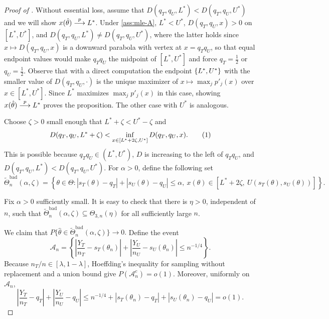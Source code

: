 \documentclass[12pt,reqno]{amsart}
\theoremstyle{theorem}
\theoremstyle{definition}
\newcommand\numberthis{\addtocounter{equation}{1}\tag{\theequation}}
\newcommand{\0}{\mathbf{0}}
\newcommand{\1}{\mathbf{1}}
\begin{document}
\begin{proof}[Proof of ]
Without essential loss, assume that
$
D(q_T,q_U,L^*)<D(q_T,q_U,U^*)
$ and we will show $x(\hat\theta) \overset{p}{\longrightarrow} L^*$.
Under \eqref{ass:mle-A}, \(L^*<U^*\), \(D(q_T,q_U,x)>0\) on
\([L^*,U^*]\), and
$
D(q_T,q_U,L^*) \neq D(q_T,q_U,U^*)$, where the latter holds since \(x \mapsto D(q_T,q_U,x)\) is a downward parabola with vertex at \(x = q_Tq_U\), so that equal endpoint values would make \(q_Tq_U\) the midpoint of \([L^*,U^*]\) and force \(q_T = \tfrac{1}{2}\) or \(q_U = \tfrac{1}{2}\). Observe that with a direct computation the endpoint $
\left\{{L^*, U^*}\right\}$ with the smaller
value of $D(q_T, q_U, \cdot)$ is the unique maximizer of $x\mapsto \max_j p'_j(x)$ over
$x \in [L^*, U^*]$.
Since $L^*$ maximizes $\max_j p'_j(x)$ in this
case, showing $x(\hat\theta) \overset{p}{\longrightarrow} L^*$ proves the proposition.
The other case with $U^*$ is analogous.

Choose \(\zeta>0\) small enough that
$
L^*+\zeta<U^*-\zeta
$
and
\[
D(q_T,q_U,L^*+\zeta)
<
\inf_{x\in[L^*+2\zeta,U^*]}D(q_T,q_U,x). \numberthis \label{eq:bad-set-d-gap}
\]
This is possible because \(q_Tq_U\in(L^*,U^*)\), \(D\) is increasing to the left
of \(q_Tq_U\), and \(D(q_T,q_U,L^*)<D(q_T,q_U,U^*)\). For \(\alpha>0\), define the
following set
\[
\widetilde\Theta^{\mathrm{bad}}_n(\alpha,\zeta)
=
\left\{
\theta\in\Theta:
|s_T(\theta)-q_T|+|s_U(\theta)-q_U|\le\alpha,\
x(\theta)\in[L^*+2\zeta,\ U(s_T(\theta),s_U(\theta))]
\right\}.
\]
{Fix \(\alpha>0\) sufficiently small.  It is easy to check that there is
\(\eta>0\), independent of \(n\), such that
$
\widetilde\Theta^{\mathrm{bad}}_n(\alpha,\zeta)
\subseteq\Theta_{3,n}(\eta)
$
for all sufficiently large \(n\).

We claim that
\(
P\{\hat\theta\in\widetilde\Theta^{\mathrm{bad}}_n(\alpha,\zeta)\}\to0.
\)
Define the event
\[
\mathcal A_n
=
\left\{
\left|\frac{Y_T}{n_T}-s_T(\theta_n)\right|
+
\left|\frac{Y_U}{n_U}-s_U(\theta_n)\right|
\le n^{-1/4}
\right\}.
\]
Because \(n_T/n\in[\lambda,1-\lambda]\), Hoeffding's inequality for sampling
without replacement and a union bound give \(P(\mathcal A_n^c)=o(1)\).  Moreover,
uniformly on \(\mathcal A_n\),
\[
\left|\frac{Y_T}{n_T}-q_T\right|
+
\left|\frac{Y_U}{n_U}-q_U\right|
\le
n^{-1/4}
+|s_T(\theta_n)-q_T|
+|s_U(\theta_n)-q_U|
=o(1).
\]

}
\end{proof}
\end{document}
